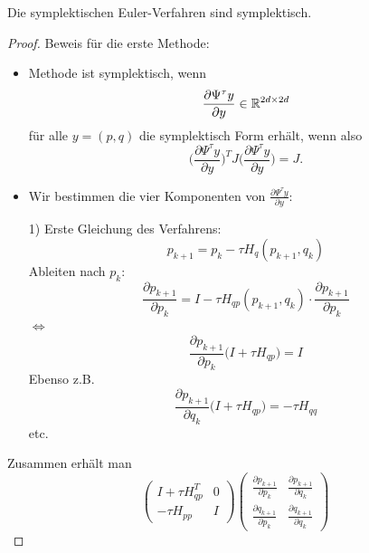 \begin{satz}
	Die symplektischen Euler-Verfahren sind symplektisch.
\end{satz}
\begin{proof}
	Beweis für die erste Methode:
	\begin{itemize}
		\item Methode ist symplektisch, wenn
		\begin{equation*}
		\frac{\partial\Psi^\tau y}{\partial y}\in \mathbb R^{2d\times 2d}
		\end{equation*}
		für alle $y=(p,q)$ die symplektisch Form erhält, wenn also
		\begin{equation}\label{eq:symplektische_form}
		\Big(\frac{\partial\Psi^\tau y}{\partial y}\Big)^TJ\Big(\frac{\partial\Psi^\tau y}{\partial y}\Big) = J.
		\end{equation}
		\item Wir bestimmen die vier Komponenten von $\frac{\partial\Psi^\tau y}{\partial y}$:
		\item [1)] Erste Gleichung des Verfahrens:
		\begin{equation*}
		p_{k+1} = p_k - \tau H_q(p_{k+1},q_k)
		\end{equation*}
		Ableiten nach $p_k$:
		\begin{equation*}
		\frac{\partial p_{k+1}}{\partial p_k} = I - \tau H_{qp}(p_{k+1},q_k)\cdot \frac{\partial p_{k+1}}{\partial p_k}
		\end{equation*}
		$\Leftrightarrow$
		\begin{equation*}
		\frac{\partial p_{k+1}}{\partial p_k}\Big(I + \tau H_{qp}\Big) = I
		\end{equation*}
		Ebenso z.B.
		\begin{equation*}
		\frac{\partial p_{k+1}}{\partial q_k}\Big(I + \tau H_{qp}\Big) = -\tau H_{qq}
		\end{equation*}
		etc.
	\end{itemize}
	Zusammen erhält man
	\begin{equation*}
	\begin{pmatrix}
	I + \tau H_{qp}^T & 0 \\ -\tau H_{pp} & I
	\end{pmatrix}
	\begin{pmatrix}
	\frac{\partial p_{k+1}}{\partial p_k} & 	\frac{\partial p_{k+1}}{\partial q_k} \\
	\frac{\partial q_{k+1}}{\partial p_k}  & 	\frac{\partial q_{k+1}}{\partial q_k}
	\end{pmatrix}

\end{equation*}
\end{proof}
